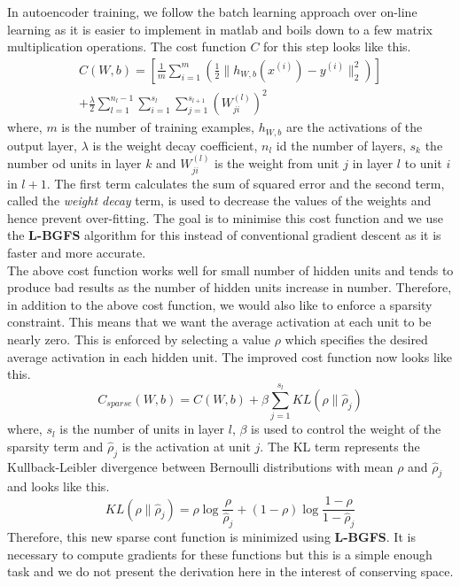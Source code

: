 \documentclass[10pt,twocolumn,letterpaper]{article}
\begin{document}
In autoencoder training, we follow the batch learning approach over on-line learning as it is easier to implement in matlab and boils down to a few matrix multiplication operations. The cost function $C$ for this step looks like this.
\begin{multline*}
C(W,b) = \left[\frac{1}{m}\displaystyle\sum\limits_{i=1}^m \left(\frac{1}{2}\|h_{W,b}(x^{(i)})-y^{(i)}\|^2_2\right)\right]\\
+\frac{\lambda}{2}\sum\limits_{l=1}^{n_l-1}\sum\limits_{i=1}^{s_l} \sum\limits_{j=1}^{s_{l+1}} (W_{ji}^{(l)})^2
\end{multline*}
where, $m$ is the number of training examples, $h_{W,b}$ are the activations of the output layer, $\lambda$ is the weight decay coefficient, $n_l$ id the number of layers, $s_k$ the number od units in layer $k$ and $W_{ji}^{(l)}$ is the weight from unit $j$ in layer $l$ to unit $i$ in $l+1$. The first term calculates the sum of squared error and the second term, called the \textit{weight decay} term, is used to decrease the values of the weights and hence prevent over-fitting. The goal is to minimise this cost function and we use the \textbf{L-BGFS} algorithm for this instead of conventional gradient descent as it is faster and more accurate.\\

The above cost function works well for small number of hidden units and tends to produce bad results as the number of hidden units increase in number. Therefore, in addition to the above cost function, we would also like to enforce a sparsity constraint. This means that we want the average activation at each unit to be nearly zero. This is enforced by selecting a value $\rho$ which specifies the desired average activation in each hidden unit. The improved cost function now looks like this. $$C_{sparse}(W,b) = C(W,b) + \beta\displaystyle\sum\limits_{j=1}^{s_l} KL(\rho\|\hat{\rho}_j)$$ where, $s_l$ is the number of units in layer $l$, $\beta$ is used to control the weight of the sparsity term and $\hat{\rho}_j$ is the activation at unit $j$. The KL term represents the Kullback-Leibler divergence between Bernoulli distributions with mean $\rho$ and $\hat{\rho}_j$ and looks like this.
$$KL(\rho\|\hat{\rho}_j) = \rho\log\frac{\rho}{\hat{\rho}_j} + (1-\rho)\log\frac{1-\rho}{1-\hat{\rho}_j}$$
Therefore, this new sparse cont function is minimized using \textbf{L-BGFS}. It is necessary to compute gradients for these functions but this is a simple enough task and we do not present the derivation here in the interest of conserving space.
\end{document}
